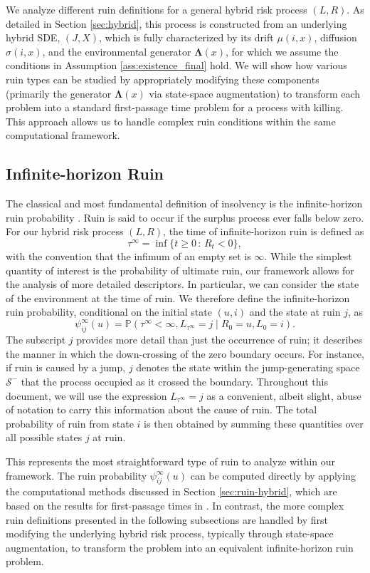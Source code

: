\documentclass[11pt]{article}
\numberwithin{table}{section}
\numberwithin{figure}{section}
\numberwithin{equation}{section}
\newcommand{\1}{{\mathbf 1}}
\newcommand{\0}{\mat{0}}
\begin{document}
We analyze different ruin definitions for a general hybrid risk process $(L,R)$. As detailed in Section \ref{sec:hybrid}, this process is constructed from an underlying hybrid SDE, $(J,X)$, which is fully characterized by its drift $\mu(i,x)$, diffusion $\sigma(i,x)$, and the environmental generator $\bm{\Lambda}(x)$, for which we assume the conditions in Assumption \ref{ass:existence_final} hold. We will show how various ruin types can be studied by appropriately modifying these components (primarily the generator $\bm{\Lambda}(x)$ via state-space augmentation) to transform each problem into a standard first-passage time problem for a process with killing. This approach allows us to handle complex ruin conditions within the same computational framework.

\subsection{Infinite-horizon Ruin}

The classical and most fundamental definition of insolvency is the infinite-horizon ruin probability \cite{asmussen2010ruin}. Ruin is said to occur if the surplus process ever falls below zero. For our hybrid risk process \((L,R)\), the time of infinite-horizon ruin is defined as
\[
\tau^\infty = \inf\{ t \ge 0 \,:\, R_t < 0 \},
\]
with the convention that the infimum of an empty set is \(\infty\). While the simplest quantity of interest is the probability of ultimate ruin, our framework allows for the analysis of more detailed descriptors. In particular, we can consider the state of the environment at the time of ruin. We therefore define the infinite-horizon ruin probability, conditional on the initial state \((u,i)\) and the state at ruin \(j\), as
\[
\psi_{ij}^\infty(u) = \mathbb{P}(\tau^\infty < \infty, L_{\tau^\infty} = j \mid R_0 = u, L_0 = i).
\]
The subscript \(j\) provides more detail than just the occurrence of ruin; it describes the manner in which the down-crossing of the zero boundary occurs. For instance, if ruin is caused by a jump, \(j\) denotes the state within the jump-generating space $\mathcal{S}^-$ that the process occupied as it crossed the boundary. Throughout this document, we will use the expression $L_{\tau^\infty} = j$ as a convenient, albeit slight, abuse of notation to carry this information about the cause of ruin. The total probability of ruin from state \(i\) is then obtained by summing these quantities over all possible states \(j\) at ruin.

This represents the most straightforward type of ruin to analyze within our framework. The ruin probability \(\psi_{ij}^\infty(u)\) can be computed directly by applying the computational methods discussed in Section \ref{sec:ruin-hybrid}, which are based on the results for first-passage times in \cite{albrecher2022space}. In contrast, the more complex ruin definitions presented in the following subsections are handled by first modifying the underlying hybrid risk process, typically through state-space augmentation, to transform the problem into an equivalent infinite-horizon ruin problem.
\end{document}
